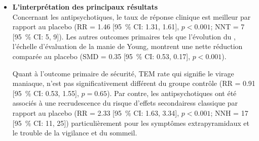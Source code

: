 \begin{itemize}[label=\textbullet]
    Les méthodes utilisées pour interpréter les résultats de cette méta-analyse semblent répondre à l’EBM. Toutefois, le talon d’Achille de cette étude est le nombre d’études disponibles et leur qualité intrinsèque, en effet la majorité des articles étaient des analyses post-hoc, c’est-à-dire, des analyses qui n’avaient pas pour objet la thématique de cette méta-analyse mais dont les données ont été recueillies. Les auteurs qualifient donc cette méta-analyse de préliminaire, nécessitant par la suite des RCT prospectifs. De plus, les variations de définition de dépression avec caractéristiques mixtes sont retrouvées dans la littérature médicale ce qui complique la réalisation de la méta-analyse et peut-être biaise la sélection des patients. 
    
    \item \textbf{L'interprétation des principaux résultats}\\
    Concernant les antipsychotiques, le taux de réponse clinique est meilleur par rapport au placebo  (RR = \num{1.46} [\qty{95}{\percent} CI: \num{1.31}, \num{1.61}], $p < \num{0.001}$; NNT = 7 [\qty{95}{\percent} CI: 5, 9]).  Les autres outcomes primaires tels que l’évolution du , l’échelle d’évaluation de la manie de Young, montrent une nette réduction comparée au placebo (SMD = \num{0.35} [\qty{95}{\percent} CI: \num{0.53}, \num{0.17}], $p < \num{0.001}$). 
    
    Quant à l’outcome primaire de sécurité, TEM rate qui signifie le virage maniaque, n’est pas significativement différent du groupe contrôle (RR = \num{0.91} [\qty{95}{\percent} CI: \num{0.53}, \num{1.55}], $p = \num{0.65}$). Par contre, les antipsychotiques ont été associés à une recrudescence du risque d’effets secondairess classique par rapport au placebo (RR = \num{2.33} [\qty{95}{\percent} CI: \num{1.63}, \num{3.34}], $p < \num{0.001}$; NNH = 17 [\qty{95}{\percent} CI: 11, 25]) particulièrement pour les symptômes extrapyramidaux et le trouble de la vigilance et du sommeil.
    

\end{itemize}
